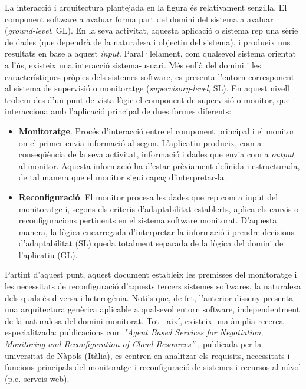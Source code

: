 La interacció i arquitectura plantejada en la figura és relativament senzilla. El component software a avaluar forma part del domini del sistema a avaluar (\textit{ground-level}, GL). En la seva activitat, aquesta aplicació o sistema rep una sèrie de dades (que dependrà de la naturalesa i objectiu del sistema), i produeix uns resultats en base a aquest \textit{input}. Paral·lelament, com qualsevol sistema orientat a l'ús, existeix una interacció sistema-usuari. Més enllà del domini i les característiques pròpies dels sistemes software, es presenta l'entorn corresponent al sistema de supervisió o monitoratge (\textit{supervisory-level}, SL). En aquest nivell trobem des d'un punt de vista lògic el component de supervisió o monitor, que interacciona amb l'aplicació principal de dues formes diferents:

\begin{itemize}
\item \textbf{Monitoratge}. Procés d'interacció entre el component principal i el monitor on el primer envia informació al segon. L'aplicatiu produeix, com a conseqüència de la seva activitat, informació i dades que envia com a \textit{output} al monitor. Aquesta informació ha d'estar prèviament definida i estructurada, de tal manera que el monitor sigui capaç d'interpretar-la.
\item \textbf{Reconfiguració}. El monitor procesa les dades que rep com a input del monitoratge i, segons els criteris d'adaptabilitat establerts, aplica els canvis o reconfiguracions pertinents en el sistema software monitorat. D'aquesta manera, la lògica encarregada d'interpretar la informació i prendre decisions d'adaptabilitat (SL) queda totalment separada de la lògica del domini de l'aplicatiu (GL).
\end{itemize}

Partint d'aquest punt, aquest document estableix les premisses del monitoratge i les necessitats de reconfiguració d’aquests tercers sistemes softwares, la naturalesa dels quals és diversa i heterogènia. Noti's que, de fet, l'anterior disseny presenta una arquitectura genèrica aplicable a qualsevol entorn software, independentment de la naturalesa del domini monitorat. Tot i així, existeix una àmplia recerca especialitzada: publicacions com \textit{"Agent Based Services for Negotiation, Monitoring and Reconfiguration of Cloud Resources”} , publicada per la universitat de Nàpols (Itàlia), es centren en analitzar els requisits, necessitats i funcions principals del monitoratge i reconfiguració de sistemes i recursos al núvol (p.e. serveis web).\\

